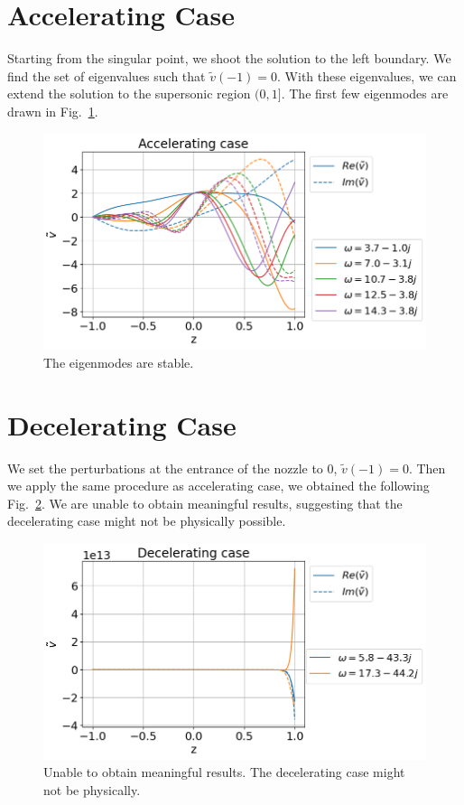 \section{Accelerating Case}
Starting from the singular point, we shoot the solution to the left boundary. We find the set of eigenvalues such that $\tilde{v}(-1)=0$. With these eigenvalues, we can extend the solution to the supersonic region $(0,1]$. The first few eigenmodes are drawn in Fig.~\ref{fig:results-accelerating-v}.
\begin{figure} [H]
	\centering
	\includegraphics[width=0.7\linewidth]{figures/results-accelerating-v}
	\caption{The eigenmodes are stable.}
	\label{fig:results-accelerating-v}
\end{figure}

\section{Decelerating Case}
We set the perturbations at the entrance of the nozzle to 0, $\tilde{v}(-1)=0$. Then we apply the same procedure as accelerating case, we obtained the following Fig.~\ref{fig:results-decelerating-v}. We are unable to obtain meaningful results, suggesting that the decelerating case might not be physically possible.
\begin{figure} [H]
	\centering
	\includegraphics[width=0.7\linewidth]{figures/results-decelerating-v}
	\caption{Unable to obtain meaningful results. The decelerating case might not be physically.}
	\label{fig:results-decelerating-v}
\end{figure}
